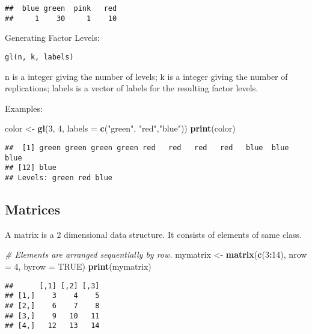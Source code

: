 \documentclass[]{book}
\newenvironment{Shaded}{\begin{snugshade}}{\end{snugshade}}
\newcommand{\KeywordTok}[1]{\textcolor[rgb]{0.13,0.29,0.53}{\textbf{#1}}}
\newcommand{\DataTypeTok}[1]{\textcolor[rgb]{0.13,0.29,0.53}{#1}}
\newcommand{\DecValTok}[1]{\textcolor[rgb]{0.00,0.00,0.81}{#1}}
\newcommand{\StringTok}[1]{\textcolor[rgb]{0.31,0.60,0.02}{#1}}
\newcommand{\CommentTok}[1]{\textcolor[rgb]{0.56,0.35,0.01}{\textit{#1}}}
\newcommand{\OtherTok}[1]{\textcolor[rgb]{0.56,0.35,0.01}{#1}}
\newcommand{\OperatorTok}[1]{\textcolor[rgb]{0.81,0.36,0.00}{\textbf{#1}}}
\newcommand{\NormalTok}[1]{#1}
\theoremstyle{definition}
\theoremstyle{definition}
\theoremstyle{definition}
\theoremstyle{remark}
\begin{document}
\begin{verbatim}
##  blue green  pink   red 
##     1    30     1    10
\end{verbatim}

Generating Factor Levels:

\begin{verbatim}
gl(n, k, labels)
\end{verbatim}

n is a integer giving the number of levels; k is a integer giving the
number of replications; labels is a vector of labels for the resulting
factor levels.

Examples:

\begin{Shaded}
\begin{Highlighting}[]
\NormalTok{color <-}\StringTok{ }\KeywordTok{gl}\NormalTok{(}\DecValTok{3}\NormalTok{, }\DecValTok{4}\NormalTok{, }\DataTypeTok{labels =} \KeywordTok{c}\NormalTok{(}\StringTok{"green"}\NormalTok{, }\StringTok{"red"}\NormalTok{,}\StringTok{"blue"}\NormalTok{))}
\KeywordTok{print}\NormalTok{(color)}
\end{Highlighting}
\end{Shaded}

\begin{verbatim}
##  [1] green green green green red   red   red   red   blue  blue  blue 
## [12] blue 
## Levels: green red blue
\end{verbatim}

\subsection{Matrices}\label{matrices}

A matrix is a 2 dimensional data structure. It consists of elements of
same class.

\begin{Shaded}
\begin{Highlighting}[]
\CommentTok{# Elements are arranged sequentially by row.}
\NormalTok{mymatrix <-}\StringTok{ }\KeywordTok{matrix}\NormalTok{(}\KeywordTok{c}\NormalTok{(}\DecValTok{3}\OperatorTok{:}\DecValTok{14}\NormalTok{), }\DataTypeTok{nrow =} \DecValTok{4}\NormalTok{, }\DataTypeTok{byrow =} \OtherTok{TRUE}\NormalTok{)}
\KeywordTok{print}\NormalTok{(mymatrix)}
\end{Highlighting}
\end{Shaded}

\begin{verbatim}
##      [,1] [,2] [,3]
## [1,]    3    4    5
## [2,]    6    7    8
## [3,]    9   10   11
## [4,]   12   13   14
\end{verbatim}
\end{document}
